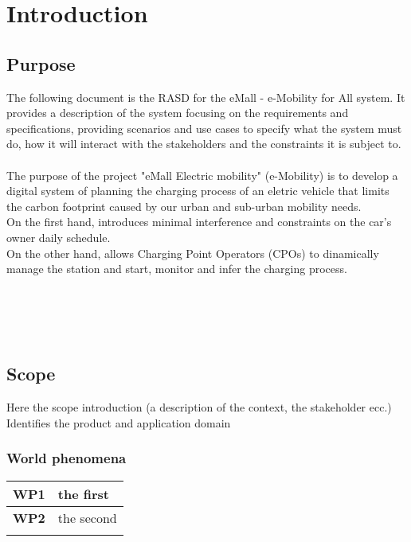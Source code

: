 \section{Introduction}\label{intro}

\subsection{Purpose}
The following document is the RASD for the eMall - e-Mobility for All system. It provides
a description of the system focusing on the requirements and specifications, providing scenarios and use cases
to specify what the system must do, how it will interact with the stakeholders and the constraints it is subject to.
\\\\
The purpose of the project "eMall Electric mobility" 
(e-Mobility) is to develop a digital system of 
planning the charging process of an eletric vehicle
that limits the carbon footprint caused by our urban and
sub-urban mobility needs.\\On the first hand, introduces minimal interference
and constraints on the car's owner daily schedule.
\\On the other hand, allows Charging Point Operators (CPOs)
to dinamically manage the station and start, monitor and infer the 
charging process.
\\\\
\\\\\\

\subsection{Scope}
Here the scope introduction (a description of the context, the stakeholder ecc.)
Identifies the product and application domain
\subsubsection*{World phenomena}
\begin{table}[h]
    \begin{tabular}{|l|l|}
        \toprule
        \textbf{WP1} & the first  \\ \midrule
        \textbf{WP2} & the second \\ \midrule
                     &            \\ \bottomrule
    \end{tabular}
\end{table}
